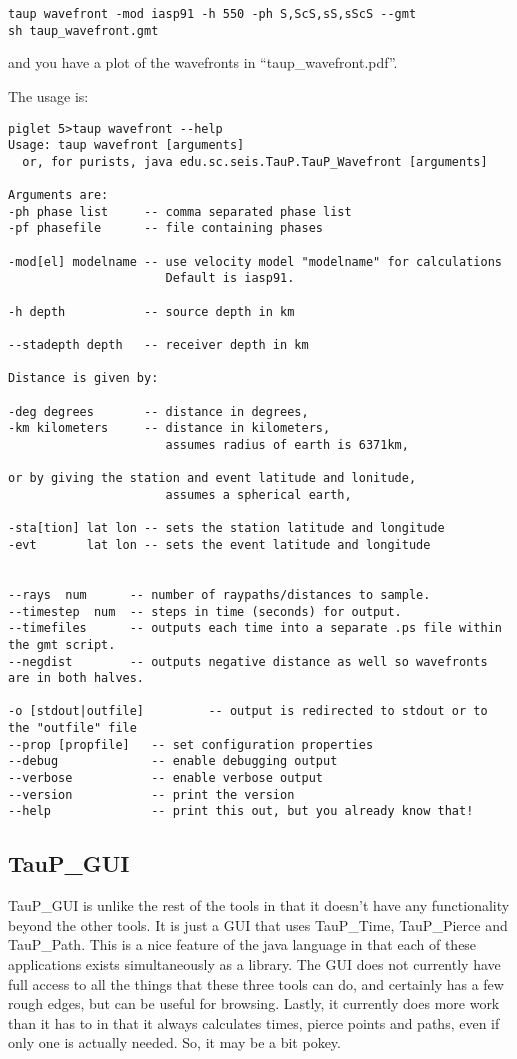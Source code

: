 \begin{verbatim}
taup wavefront -mod iasp91 -h 550 -ph S,ScS,sS,sScS --gmt
sh taup_wavefront.gmt
\end{verbatim}

and you have a plot of the wavefronts in ``taup\_wavefront.pdf''.

The usage is:
\begin{verbatim}
piglet 5>taup wavefront --help
Usage: taup wavefront [arguments]
  or, for purists, java edu.sc.seis.TauP.TauP_Wavefront [arguments]

Arguments are:
-ph phase list     -- comma separated phase list
-pf phasefile      -- file containing phases

-mod[el] modelname -- use velocity model "modelname" for calculations
                      Default is iasp91.

-h depth           -- source depth in km

--stadepth depth   -- receiver depth in km

Distance is given by:

-deg degrees       -- distance in degrees,
-km kilometers     -- distance in kilometers,
                      assumes radius of earth is 6371km,

or by giving the station and event latitude and lonitude,
                      assumes a spherical earth,

-sta[tion] lat lon -- sets the station latitude and longitude
-evt       lat lon -- sets the event latitude and longitude


--rays  num      -- number of raypaths/distances to sample.
--timestep  num  -- steps in time (seconds) for output.
--timefiles      -- outputs each time into a separate .ps file within the gmt script.
--negdist        -- outputs negative distance as well so wavefronts are in both halves.

-o [stdout|outfile]         -- output is redirected to stdout or to the "outfile" file
--prop [propfile]   -- set configuration properties
--debug             -- enable debugging output
--verbose           -- enable verbose output
--version           -- print the version
--help              -- print this out, but you already know that!
\end{verbatim}

\subsection{TauP\_GUI}
TauP\_GUI is unlike the rest of the tools in that it doesn't have any functionality
 beyond the other tools. It is just a GUI that uses TauP\_Time, TauP\_Pierce
and TauP\_Path. This is a nice feature of the java language in that each of
these applications exists simultaneously as a library. The GUI does not
currently have full access to all the things that these
three tools can do, and certainly has a few rough edges, but can be useful
for browsing. Lastly, it currently does more work than it has to in that it
always calculates times, pierce points and paths, even if only one is actually
needed. So, it may be a bit pokey.

